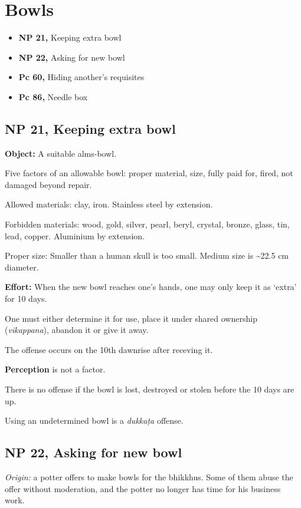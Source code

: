 \chapter{Bowls}

\begin{itemize}
\tightlist
\item
  \textbf{NP 21,} Keeping extra bowl
\item
  \textbf{NP 22,} Asking for new bowl
\item
  \textbf{Pc 60,} Hiding another's requisites
\item
  \textbf{Pc 86,} Needle box
\end{itemize}

\section{NP 21, Keeping extra bowl}

\textbf{Object:} A suitable alms-bowl.

Five factors of an allowable bowl: proper material, size, fully paid
for, fired, not damaged beyond repair.

Allowed materials: clay, iron. Stainless steel by extension.

Forbidden materials: wood, gold, silver, pearl, beryl, crystal, bronze,
glass, tin, lead, copper. Aluminium by extension.

Proper size: Smaller than a human skull is too small. Medium size is
\textasciitilde22.5 cm diameter.

\textbf{Effort:} When the new bowl reaches one's hands, one may only
keep it as `extra' for 10 days.

One must either determine it for use, place it under shared ownership
(\emph{vikappana}), abandon it or give it away.

The offense occurs on the 10th dawnrise after receving it.

\textbf{Perception} is not a factor.

There is no offense if the bowl is lost, destroyed or stolen before the
10 days are up.

Using an undetermined bowl is a \emph{dukkaṭa} offense.

\section{NP 22, Asking for new bowl}

\emph{Origin:} a potter offers to make bowls for the bhikkhus. Some of
them abuse the offer without moderation, and the potter no longer has
time for his business work.

